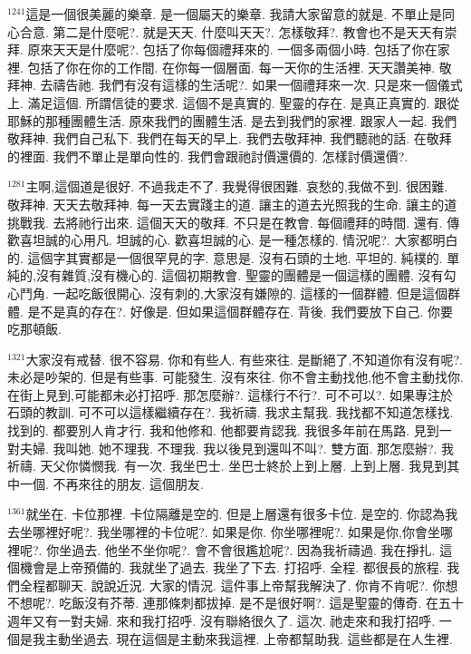 \documentclass{book}
\begin{document}
$^{1241}$這是一個很美麗的樂章.
是一個屬天的樂章.
我請大家留意的就是.
不單止是同心合意.
第二是什麼呢?.
就是天天.
什麼叫天天?.
怎樣敬拜?.
教會也不是天天有崇拜.
原來天天是什麼呢?.
包括了你每個禮拜來的.
一個多兩個小時.
包括了你在家裡.
包括了你在你的工作間.
在你每一個層面.
每一天你的生活裡.
天天讚美神.
敬拜神.
去禱告祂.
我們有沒有這樣的生活呢?.
如果一個禮拜來一次.
只是來一個儀式上.
滿足這個.
所謂信徒的要求.
這個不是真實的.
聖靈的存在.
是真正真實的.
跟從耶穌的那種團體生活.
原來我們的團體生活.
是去到我們的家裡.
跟家人一起.
我們敬拜神.
我們自己私下.
我們在每天的早上.
我們去敬拜神.
我們聽祂的話.
在敬拜的裡面.
我們不單止是單向性的.
我們會跟祂討價還價的.
怎樣討價還價?.

$^{1281}$主啊,這個道是很好.
不過我走不了.
我覺得很困難.
哀愁的,我做不到.
很困難.
敬拜神.
天天去敬拜神.
每一天去實踐主的道.
讓主的道去光照我的生命.
讓主的道挑戰我.
去將祂行出來.
這個天天的敬拜.
不只是在教會.
每個禮拜的時間.
還有.
傳歡喜坦誠的心用凡.
坦誠的心.
歡喜坦誠的心.
是一種怎樣的.
情況呢?.
大家都明白的.
這個字其實都是一個很罕見的字.
意思是.
沒有石頭的土地.
平坦的.
純樸的.
單純的,沒有雜質,沒有機心的.
這個初期教會.
聖靈的團體是一個這樣的團體.
沒有勾心鬥角.
一起吃飯很開心.
沒有刺的,大家沒有嫌隙的.
這樣的一個群體.
但是這個群體.
是不是真的存在?.
好像是.
但如果這個群體存在.
背後.
我們要放下自己.
你要吃那頓飯.

$^{1321}$大家沒有戒替.
很不容易.
你和有些人.
有些來往.
是斷絕了,不知道你有沒有呢?.
未必是吵架的.
但是有些事.
可能發生.
沒有來往.
你不會主動找他,他不會主動找你.
在街上見到,可能都未必打招呼.
那怎麼辦?.
這樣行不行?.
可不可以?.
如果專注於石頭的教訓.
可不可以這樣繼續存在?.
我祈禱.
我求主幫我.
我找都不知道怎樣找.
找到的.
都要別人肯才行.
我和他修和.
他都要肯認我.
我很多年前在馬路.
見到一對夫婦.
我叫她.
她不理我.
不理我.
我以後見到還叫不叫?.
雙方面.
那怎麼辦?.
我祈禱.
天父你憐憫我.
有一次.
我坐巴士.
坐巴士終於上到上層.
上到上層.
我見到其中一個.
不再來往的朋友.
這個朋友.

$^{1361}$就坐在.
卡位那裡.
卡位隔離是空的.
但是上層還有很多卡位.
是空的.
你認為我去坐哪裡好呢?.
我坐哪裡的卡位呢?.
如果是你.
你坐哪裡呢?.
如果是你,你會坐哪裡呢?.
你坐過去.
他坐不坐你呢?.
會不會很尷尬呢?.
因為我祈禱過.
我在掙扎.
這個機會是上帝預備的.
我就坐了過去.
我坐了下去.
打招呼.
全程.
都很長的旅程.
我們全程都聊天.
說說近況.
大家的情況.
這件事上帝幫我解決了.
你肯不肯呢?.
你想不想呢?.
吃飯沒有芥蒂.
連那條刺都拔掉.
是不是很好啊?.
這是聖靈的傳奇.
在五十週年又有一對夫婦.
來和我打招呼.
沒有聯絡很久了.
這次.
祂走來和我打招呼.
一個是我主動坐過去.
現在這個是主動來我這裡.
上帝都幫助我.
這些都是在人生裡.
\end{document}
